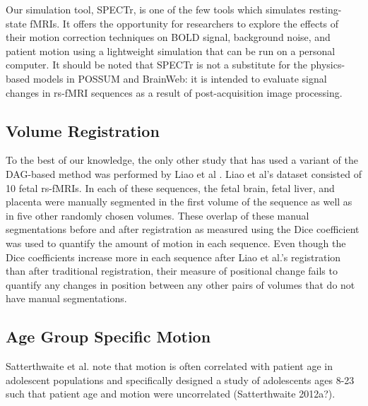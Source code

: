 Our simulation tool, SPECTr, is one of the few tools which simulates resting-state fMRIs. It offers the opportunity for researchers to explore the effects of their motion correction techniques on BOLD signal, background noise, and patient motion using a lightweight simulation that can be run on a personal computer. It should be noted that SPECTr is not a substitute for the physics-based models in POSSUM and BrainWeb: it is intended to evaluate signal changes in rs-fMRI sequences as a result of post-acquisition image processing.

\subsection{Volume Registration} 

To the best of our knowledge, the only other study that has used a variant of the DAG-based method was performed by Liao et al \cite{Liao2016}. Liao et al’s dataset consisted of 10 fetal rs-fMRIs. In each of these sequences, the fetal brain, fetal liver, and placenta were manually segmented in the first volume of the sequence as well as in five other randomly chosen volumes. These overlap of these manual segmentations before and after registration as measured using the Dice coefficient was used to quantify the amount of motion in each sequence. Even though the Dice coefficients increase more in each sequence after Liao et al.’s registration than after traditional registration, their measure of positional change fails to quantify any changes in position between any other pairs of volumes that do not have manual segmentations. 

\subsection{Age Group Specific Motion}

Satterthwaite et al. note that motion is often correlated with patient age in adolescent populations and specifically designed a study of adolescents ages 8-23 such that patient age and motion were uncorrelated (Satterthwaite 2012a?).